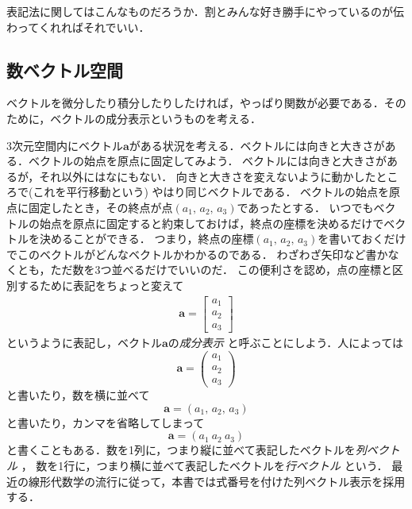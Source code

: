 表記法に関してはこんなものだろうか．割とみんな好き勝手にやっているのが伝わってくれればそれでいい．

\subsection{数ベクトル空間}
ベクトルを微分したり積分したりしたければ，やっぱり関数が必要である．そのために，ベクトルの成分表示というものを考える．

3次元空間内にベクトル$\bm{a}$がある状況を考える．ベクトルには向きと大きさがある．ベクトルの始点を原点に固定してみよう．
ベクトルには向きと大きさがあるが，それ以外にはなにもない．
向きと大きさを変えないように動かしたところで(これを平行移動という)
やはり同じベクトルである．
ベクトルの始点を原点に固定したとき，その終点が点$(a_1, \, a_2, \, a_3)$であったとする．
いつでもベクトルの始点を原点に固定すると約束しておけば，終点の座標を決めるだけでベクトルを決めることができる．
つまり，終点の座標$(a_1, \,  a_2, \, a_3)$を書いておくだけでこのベクトルがどんなベクトルかわかるのである．
わざわざ矢印など書かなくとも，ただ数を3つ並べるだけでいいのだ．
この便利さを認め，点の座標と区別するために表記をちょっと変えて
\begin{align}
\bm{a} = \left[
 \begin{array}{c}
    a_1 \\
    a_2 \\
    a_3
 \end{array}
           \right]
 \label{eq:vec3d}
 \end{align}
 というように表記し，ベクトル$\bm{a}$の\emph{成分表示}
と呼ぶことにしよう．人によっては
 $$
 \bm{a} = \left(
 \begin{array}{c}
    a_1 \\
    a_2 \\
    a_3
 \end{array}
           \right)
$$
と書いたり，数を横に並べて
$$
\bm{a} = (a_1, \, a_2, \, a_3)
$$
と書いたり，カンマを省略してしまって
$$
\bm{a} = (a_1 \ a_2 \ a_3)
$$
と書くこともある．数を1列に，つまり縦に並べて表記したベクトルを\emph{列ベクトル}
，
数を1行に，つまり横に並べて表記したベクトルを\emph{行ベクトル}
という．
最近の線形代数学の流行に従って，本書では式番号を付けた列ベクトル表示を採用する．

